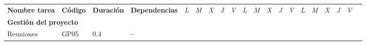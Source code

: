 \begin{longtable}[c]{llclllllllllllllllll}
        \multicolumn{1}{|c|}{\multirow{-2}{*}{\textbf{Nombre tarea}}}                         & \multicolumn{1}{c|}{\multirow{-2}{*}{\textbf{Código}}}                         & \multicolumn{1}{c|}{\multirow{-2}{*}{\textbf{Duración}}}                         & \multicolumn{1}{c|}{\multirow{-2}{*}{\textbf{Dependencias}}}                         & \multicolumn{1}{l|}{\textit{L}} & \multicolumn{1}{l|}{\textit{M}} & \multicolumn{1}{l|}{\textit{X}} & \multicolumn{1}{l|}{\textit{J}} & \multicolumn{1}{l|}{\textit{V}} & \multicolumn{1}{l|}{\textit{L}} & \multicolumn{1}{l|}{\textit{M}} & \multicolumn{1}{l|}{\textit{X}} & \multicolumn{1}{l|}{\textit{J}} & \multicolumn{1}{l|}{\textit{V}} & \multicolumn{1}{l|}{\textit{L}} & \multicolumn{1}{l|}{\textit{M}} & \multicolumn{1}{l|}{\textit{X}} & \multicolumn{1}{l|}{\textit{J}} & \multicolumn{1}{l|}{\textit{V}}               &  \\ \cline{1-19}
        \multicolumn{4}{|l|}{\textbf{Gestión del proyecto}}                                                                                                                                                                                                                                                                                              & \multicolumn{15}{l|}{}                                                                                                                                                                                                                                                                                                                                                                                                                                                                                                                    &  \\ \cline{1-19}
        \multicolumn{1}{|l|}{Reuniones}                                                       & \multicolumn{1}{l|}{GP05}                                                      & \multicolumn{1}{l|}{0.4}                                                         & \multicolumn{1}{l|}{-}                                                               &                                 &                                 &                                 & \cellcolor[HTML]{EF8787}        &                                 &                                 &                                 &                                 &                                 &                                 &                                 &                                 &                                 & \cellcolor[HTML]{EF8787}        & \multicolumn{1}{l|}{}                         &  \\ \cline{1-4}

\end{longtable}
